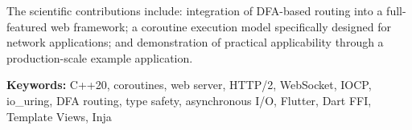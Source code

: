 The scientific contributions include: integration of DFA-based routing into a full-featured web framework; a coroutine execution model specifically designed for network applications; and demonstration of practical applicability through a production-scale example application.

\vspace{1cm}

\textbf{Keywords:} C++20, coroutines, web server, HTTP/2, WebSocket, IOCP, io\_uring, DFA routing, type safety, asynchronous I/O, Flutter, Dart FFI, Template Views, Inja
